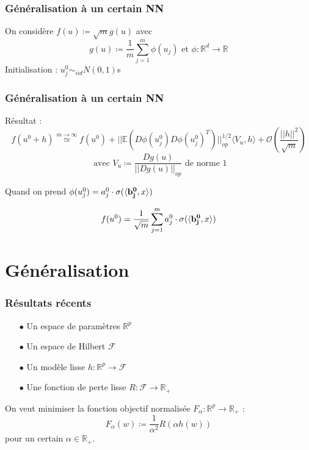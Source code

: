 \documentclass[aspectratio=169]{beamer}
\begin{document}
\begin{frame}
	\frametitle{Généralisation à un certain NN}
	On considère $f(u) \coloneqq \sqrt{m} g(u)$ avec
	 \[g(u) \coloneqq \frac{1}{m} \sum_{j=1}^{m} \phi(u_j) \text{ et } \phi : \mathbb{R}^d \to \mathbb{R} \]
	Initialisation : $u_j^0 \sim_{iid} N(0,1)$s
\end{frame}

\begin{frame}
	\frametitle{Généralisation à un certain NN}
	Résultat :
	\[ f(u^0 + h) \stackrel{m \to \infty}{\simeq} f(u^0) + ||\mathbb{E}(D \phi(u^0_j) D \phi(u^0_j)^T)||_{op}^{1/2} \langle V_u, h \rangle + \mathcal{O}\left(\frac{||h||^2}{\sqrt m}\right) \]
	\[\text{ avec $V_u \coloneqq \frac{D g(u)}{||D g(u)||_{op}}$ de norme 1} \]
	
	\pause
	
	Quand on prend $\phi (u_j^0) = a_j^0 \cdot \sigma (\langle {\bf b_j^0}, x \rangle)$
	
	\[ f(u^0) = \frac{1}{\sqrt{m}} \sum_{j=1}^{m} a_j^0 \cdot \sigma (\langle {\bf b_j^0}, x \rangle) \]
\end{frame}

\section{Généralisation}

\begin{frame}
	\frametitle{Résultats récents}
	
	\begin{itemize}
		\item[$\bullet$] Un espace de paramètres $\mathbb{R}^p$
		\pause
		\item[$\bullet$] Un espace de Hilbert $\mathcal{F}$
		\pause
		\item[$\bullet$] Un modèle lisse $h : \mathbb{R}^p \to \mathcal{F}$
		\pause
		\item[$\bullet$] Une fonction de perte lisse $R : \mathcal{F} \to \mathbb{R}_+$
	\end{itemize}

\pause

	 On veut minimiser la fonction objectif normalisée $F_{\alpha} : \mathbb{R}^p \to \mathbb{R}_+$ : \[F_{\alpha} (w) \coloneqq \frac{1}{\alpha^2} R(\alpha h(w))\] pour un certain $\alpha \in \mathbb{R}_+$.

\end{frame}
\end{document}
